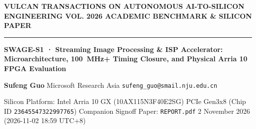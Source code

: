 \documentclass[11pt,a4paper]{article}
\begin{document}
{\scriptsize\sffamily\textcolor{vulcan}{\textbf{VULCAN TRANSACTIONS ON AUTONOMOUS AI-TO-SILICON ENGINEERING \hfill VOL. 2026 \textperiodcentered{} ACADEMIC BENCHMARK \& SILICON PAPER}}\par}

\vspace{1pt}\textcolor{vulcan}{\rule{\textwidth}{1.2pt}}\vspace{3pt}

\begin{center}

{\sffamily\LARGE\bfseries SWAGE-S1 · Streaming Image Processing \& ISP Accelerator: Microarchitecture, 100~MHz+ Timing Closure, and Physical Arria 10 FPGA Evaluation\par}\vspace{3pt}

{\small\sffamily\textbf{Sufeng Guo} \textperiodcentered{} Microsoft Research Asia \textperiodcentered{} \texttt{sufeng\_guo@smail.nju.edu.cn}\par}\vspace{1pt}

{\scriptsize\sffamily\textcolor{black!75}{Silicon Platform: Intel Arria 10 GX (\allowbreak{}10AX115N3F40E2SG)\allowbreak{} PCIe Gen3x8 (Chip ID \texttt{23645547322997765}) \textperiodcentered{} Companion Signoff Paper: \texttt{REPORT.pdf} \textperiodcentered{} 2 November 2026 (\allowbreak{}2026-11-02 18:59 UTC+\allowbreak{}8)\allowbreak{}}\par}

\end{center}\vspace{2pt}
\end{document}
